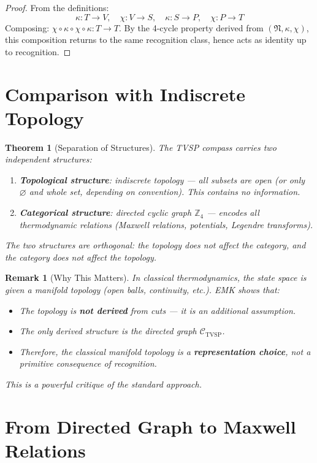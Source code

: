 \documentclass[12pt]{article}
\newtheorem{theorem}[axiom]{Theorem}
\newtheorem{remark}[axiom]{Remark}
\begin{document}
\begin{proof}
From the definitions:
\[
\kappa: T \to V,\quad \chi: V \to S,\quad \kappa: S \to P,\quad \chi: P \to T
\]
Composing: \(\chi \circ \kappa \circ \chi \circ \kappa: T \to T\). By the 4-cycle property derived from \((\mathfrak N, \kappa, \chi)\), this composition returns to the same recognition class, hence acts as identity up to recognition.
\end{proof}

\section{Comparison with Indiscrete Topology}

\begin{theorem}[Separation of Structures]
The TVSP compass carries two independent structures:
\begin{enumerate}
    \item \textbf{Topological structure}: indiscrete topology — all subsets are open (or only \(\varnothing\) and whole set, depending on convention). This contains no information.
    \item \textbf{Categorical structure}: directed cyclic graph \(\mathbb{Z}_4\) — encodes all thermodynamic relations (Maxwell relations, potentials, Legendre transforms).
\end{enumerate}
The two structures are orthogonal: the topology does not affect the category, and the category does not affect the topology.
\end{theorem}

\begin{remark}[Why This Matters]
In classical thermodynamics, the state space is given a manifold topology (open balls, continuity, etc.). EMK shows that:
\begin{itemize}
    \item The topology is \textbf{not derived} from cuts — it is an additional assumption.
    \item The only derived structure is the directed graph \(\mathcal{C}_{\text{TVSP}}\).
    \item Therefore, the classical manifold topology is a \textbf{representation choice}, not a primitive consequence of recognition.
\end{itemize}
This is a powerful critique of the standard approach.
\end{remark}

\section{From Directed Graph to Maxwell Relations}
\end{document}
